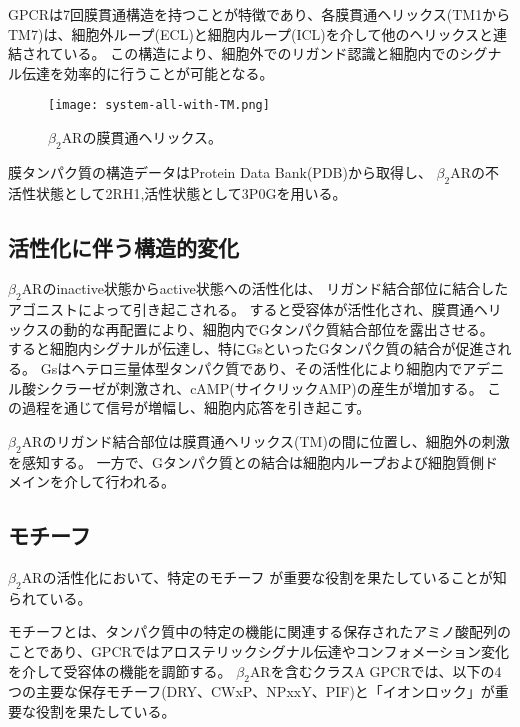 GPCRは7回膜貫通構造を持つことが特徴であり、各膜貫通ヘリックス(TM1からTM7)は、細胞外ループ(ECL)と細胞内ループ(ICL)を介して他のヘリックスと連結されている。
この構造により、細胞外でのリガンド認識と細胞内でのシグナル伝達を効率的に行うことが可能となる。

\begin{figure}[htbp]
  \centering
  \texttt{[image: system-all-with-TM.png]}
  \caption{$\beta_2$ARの膜貫通ヘリックス。}
  \label{fig:all}
\end{figure}

\newpage

膜タンパク質の構造データはProtein Data Bank(PDB)から取得し、
$\beta_2$ARの不活性状態として2RH1\cite{cherezov2007},活性状態として3P0G\cite{rasmussen2011}を用いる。

\subsection{活性化に伴う構造的変化}
$\beta_2$ARのinactive状態からactive状態への活性化は、
リガンド結合部位に結合したアゴニストによって引き起こされる。
すると受容体が活性化され、膜貫通ヘリックスの動的な再配置により、細胞内でGタンパク質結合部位を露出させる。
すると細胞内シグナルが伝達し、特にGsといったGタンパク質の結合が促進される。
Gsはヘテロ三量体型タンパク質であり、その活性化により細胞内でアデニル酸シクラーゼが刺激され、cAMP(サイクリックAMP)の産生が増加する。
この過程\cite{philip2007}を通じて信号が増幅し、細胞内応答を引き起こす。

$\beta_2$ARのリガンド結合部位は膜貫通ヘリックス(TM)の間に位置し、細胞外の刺激を感知する。
一方で、Gタンパク質との結合は細胞内ループおよび細胞質側ドメインを介して行われる。


\subsection{モチーフ}
$\beta_2$ARの活性化において、特定のモチーフ\cite{nygaard2009ligand}\cite{lee2013mapping}
が重要な役割を果たしていることが知られている。

モチーフとは、タンパク質中の特定の機能に関連する保存されたアミノ酸配列のことであり、GPCRではアロステリックシグナル伝達やコンフォメーション変化を介して受容体の機能を調節する。
$\beta_2$ARを含むクラスA GPCRでは、以下の4つの主要な保存モチーフ(DRY、CWxP、NPxxY、PIF)と「イオンロック」が重要な役割を果たしている。

